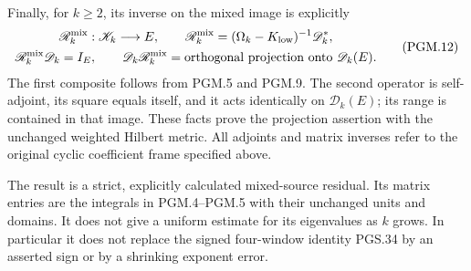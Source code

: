 Finally, for \(k\geq2\), its inverse on the mixed image is explicitly
\[
\begin{gathered}
 \mathscr R_k^{\rm mix}:\mathscr K_k\longrightarrow E,\qquad
 \mathscr R_k^{\rm mix}=(\Omega_k-K_{\rm low})^{-1}\mathscr D_k^*,
 \\
 \mathscr R_k^{\rm mix}\mathscr D_k=I_E,\qquad
 \mathscr D_k\mathscr R_k^{\rm mix}
       =\text{orthogonal projection onto }\mathscr D_k(E).
\end{gathered}
 \tag{PGM.12}\label{eq:pgm-left-inverse}
\]
The first composite follows from PGM.5 and PGM.9. The second
operator is self-adjoint, its square equals itself, and it acts
identically on \(\mathscr D_k(E)\); its range is contained in that
image. These facts prove the projection assertion with the
unchanged weighted Hilbert metric. All adjoints and matrix inverses
refer to the original cyclic coefficient frame specified above.

The result is a strict, explicitly calculated mixed-source residual.
Its matrix entries are the integrals in PGM.4--PGM.5 with their
unchanged units and domains. It does not give a uniform estimate
for its eigenvalues as \(k\) grows. In particular it does not replace
the signed four-window identity PGS.34 by an asserted sign or by a
shrinking exponent error.

